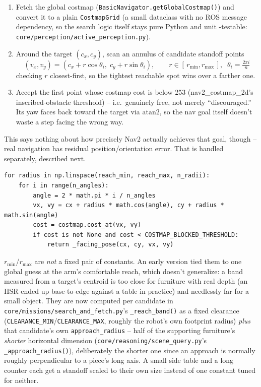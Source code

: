 \documentclass[11pt]{article}
\begin{document}
\begin{enumerate}[itemsep=2pt, topsep=2pt]
  \item Fetch the global costmap (\texttt{BasicNavigator.getGlobalCostmap()}) and
        convert it to a plain \texttt{CostmapGrid} (a small dataclass with no ROS
        message dependency, so the search logic itself stays pure Python and unit
        -testable: \texttt{core/perception/active\_perception.py}).
  \item Around the target $(c_x, c_y)$, scan an annulus of candidate standoff points
        $$ (v_x, v_y) = (c_x + r\cos\theta_i,\; c_y + r\sin\theta_i), \qquad
           r \in [\,r_{\min}, r_{\max}\,],\;\; \theta_i = \tfrac{2\pi i}{n} $$
        checking $r$ closest-first, so the tightest reachable spot wins over a
        farther one.
  \item Accept the first point whose costmap cost is below 253 (nav2\_costmap\_2d's
        inscribed-obstacle threshold) -- i.e.\ genuinely free, not merely
        ``discouraged.'' Its yaw faces back toward the target via $\mathrm{atan2}$,
        so the nav goal itself doesn't waste a step facing the wrong way.
\end{enumerate}

This says nothing about how precisely Nav2 actually achieves that goal, though --
real navigation has residual position/orientation error. That is handled separately,
described next.

\begin{lstlisting}[caption={Core search, \texttt{active\_perception.reachable\_approach\_pose}}]
for radius in np.linspace(reach_min, reach_max, n_radii):
    for i in range(n_angles):
        angle = 2 * math.pi * i / n_angles
        vx, vy = cx + radius * math.cos(angle), cy + radius * math.sin(angle)
        cost = costmap.cost_at(vx, vy)
        if cost is not None and cost < COSTMAP_BLOCKED_THRESHOLD:
            return _facing_pose(cx, cy, vx, vy)
\end{lstlisting}

$r_{\min}$/$r_{\max}$ are \emph{not} a fixed pair of constants. An early version tied
them to one global guess at the arm's comfortable reach, which doesn't generalize: a
band measured from a target's centroid is too close for furniture with real depth (an
HSR ended up base-to-edge against a table in practice) and needlessly far for a small
object. They are now computed per candidate in
\texttt{core/missions/search\_and\_fetch.py}'s \texttt{\_reach\_band()} as a fixed
clearance (\texttt{CLEARANCE\_MIN}/\texttt{CLEARANCE\_MAX}, roughly the robot's own
footprint radius) \emph{plus} that candidate's own \texttt{approach\_radius} --
half of the supporting furniture's \emph{shorter} horizontal dimension
(\texttt{core/reasoning/scene\_query.py}'s \texttt{\_approach\_radius()}), deliberately
the shorter one since an approach is normally roughly perpendicular to a piece's long
axis. A small side table and a long counter each get a standoff scaled to their own
size instead of one constant tuned for neither.
\end{document}
